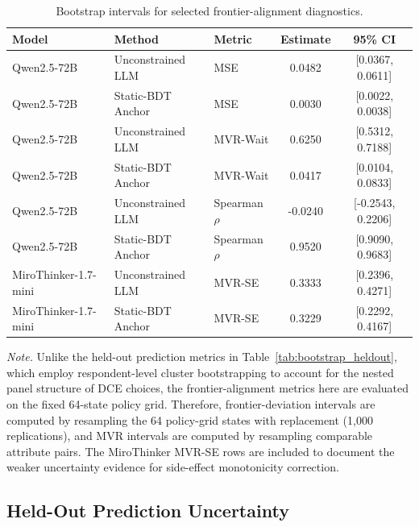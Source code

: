 \documentclass[11pt]{article}
\begin{document}
\begin{table}[t]
\centering
\caption{Bootstrap intervals for selected frontier-alignment diagnostics.}
\label{tab:bootstrap_alignment}
\small
\setlength{\tabcolsep}{6pt}
\begin{tabular}{l l l c c}
\toprule
Model & Method & Metric & Estimate & 95\% CI \\
\midrule
Qwen2.5-72B & Unconstrained LLM & MSE & 0.0482 & [0.0367, 0.0611] \\
Qwen2.5-72B & Static-BDT Anchor & MSE & 0.0030 & [0.0022, 0.0038] \\
\midrule
Qwen2.5-72B & Unconstrained LLM & MVR-Wait & 0.6250 & [0.5312, 0.7188] \\
Qwen2.5-72B & Static-BDT Anchor & MVR-Wait & 0.0417 & [0.0104, 0.0833] \\
\midrule
Qwen2.5-72B & Unconstrained LLM & Spearman \(\rho\) & -0.0240 & [-0.2543, 0.2206] \\
Qwen2.5-72B & Static-BDT Anchor & Spearman \(\rho\) & 0.9520 & [0.9090, 0.9683] \\
\midrule
MiroThinker-1.7-mini & Unconstrained LLM & MVR-SE & 0.3333 & [0.2396, 0.4271] \\
MiroThinker-1.7-mini & Static-BDT Anchor & MVR-SE & 0.3229 & [0.2292, 0.4167] \\
\bottomrule
\end{tabular}

\vspace{0.4em}
\begin{minipage}{0.95\textwidth}
\small
\textit{Note.} Unlike the held-out prediction metrics in Table~\ref{tab:bootstrap_heldout}, which employ respondent-level cluster bootstrapping to account for the nested panel structure of DCE choices, the frontier-alignment metrics here are evaluated on the fixed 64-state policy grid. Therefore, frontier-deviation intervals are computed by resampling the 64 policy-grid states with replacement (1,000 replications), and MVR intervals are computed by resampling comparable attribute pairs. The MiroThinker MVR-SE rows are included to document the weaker uncertainty evidence for side-effect monotonicity correction.
\end{minipage}
\end{table}

\subsection{Held-Out Prediction Uncertainty}
\end{document}
